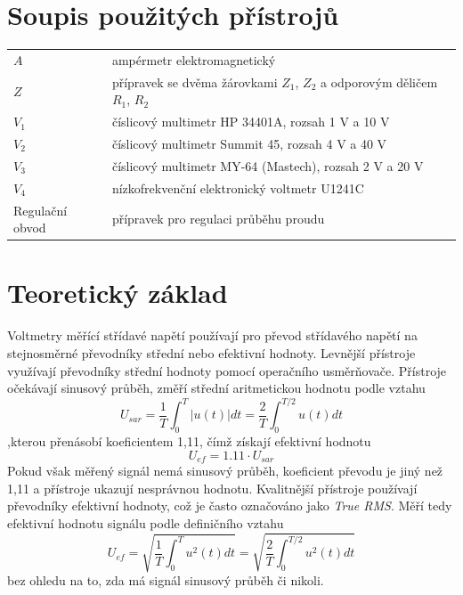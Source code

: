 \documentclass{article}
\begin{document}
\section{Soupis použitých přístrojů}
\begin{tabular}{ll}
	$A$ & ampérmetr elektromagnetický \\
	$Z$ & přípravek se dvěma žárovkami $Z_1$, $Z_2$ a odporovým děličem $R_1$, $R_2$ \\
	$V_1$ & číslicový multimetr HP 34401A, rozsah 1 V a 10 V \\
	$V_2$ & číslicový multimetr Summit 45, rozsah 4 V a 40 V \\
	$V_3$ & číslicový multimetr MY-64 (Mastech), rozsah 2 V a 20 V \\
	$V_4$ & nízkofrekvenční elektronický voltmetr U1241C \\
	Regulační obvod & přípravek pro regulaci průběhu proudu
\end{tabular}
\section{Teoretický základ}
Voltmetry měřící střídavé napětí používají pro převod střídavého napětí na stejnosměrné
převodníky střední nebo efektivní hodnoty.
Levnější přístroje využívají převodníky střední hodnoty pomocí operačního usměrňovače.
Přístroje očekávají sinusový průběh, změří střední aritmetickou hodnotu podle vztahu
\begin{equation}
	U_{sar}=\frac{1}{T}\int_{0}^{T}|u(t)|dt=\frac{2}{T}\int_{0}^{T/2}u(t)dt
\end{equation}
,kterou přenásobí koeficientem 1,11, čímž získají efektivní hodnotu
\begin{equation}
	U_{ef} = 1.11 \cdot U_{sar}
\end{equation}
Pokud však měřený signál nemá sinusový průběh, koeficient převodu je jiný než 1,11 a přístroje ukazují nesprávnou hodnotu.
Kvalitnější přístroje používají převodníky efektivní hodnoty, což je často označováno jako
\textit{True RMS}. Měří tedy efektivní hodnotu signálu podle definičního vztahu
\begin{equation}
	U_{ef} = \sqrt{\frac{1}{T}\int_{0}^{T}u^2(t)dt}=\sqrt{\frac{2}{T}\int_{0}^{T/2}u^2(t)dt}
\end{equation}
bez ohledu na to, zda má signál sinusový průběh či nikoli.
\end{document}

